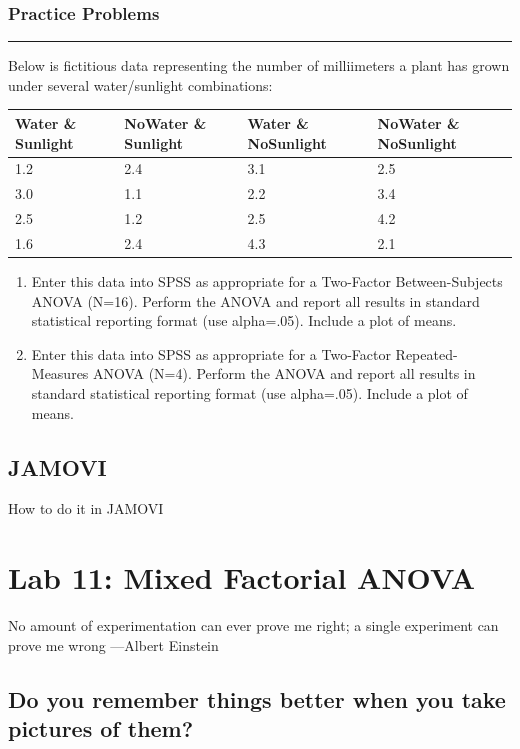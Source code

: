 \documentclass[]{book}
\begin{document}
\subsection{Practice Problems}\label{practice-problems-9}

\begin{center}\rule{0.5\linewidth}{0.5pt}\end{center}

Below is fictitious data representing the number of milliimeters a plant
has grown under several water/sunlight combinations:

\begin{longtable}[]{@{}llll@{}}
\toprule
Water \& Sunlight & NoWater \& Sunlight & Water \& NoSunlight & NoWater
\& NoSunlight\tabularnewline
\midrule
\endhead
1.2 & 2.4 & 3.1 & 2.5\tabularnewline
3.0 & 1.1 & 2.2 & 3.4\tabularnewline
2.5 & 1.2 & 2.5 & 4.2\tabularnewline
1.6 & 2.4 & 4.3 & 2.1\tabularnewline
\bottomrule
\end{longtable}

\begin{enumerate}
\def\labelenumi{\arabic{enumi}.}
\item
  Enter this data into SPSS as appropriate for a Two-Factor
  Between-Subjects ANOVA (N=16). Perform the ANOVA and report all
  results in standard statistical reporting format (use alpha=.05).
  Include a plot of means.
\item
  Enter this data into SPSS as appropriate for a Two-Factor
  Repeated-Measures ANOVA (N=4). Perform the ANOVA and report all
  results in standard statistical reporting format (use alpha=.05).
  Include a plot of means.
\end{enumerate}

\section{JAMOVI}\label{jamovi-10}

How to do it in JAMOVI

\chapter{Lab 11: Mixed Factorial
ANOVA}\label{lab-11-mixed-factorial-anova}

{ No amount of experimentation can ever prove me right; a single
experiment can prove me wrong ---Albert Einstein }

\section{Do you remember things better when you take pictures of
them?}\label{do-you-remember-things-better-when-you-take-pictures-of-them}
\end{document}

